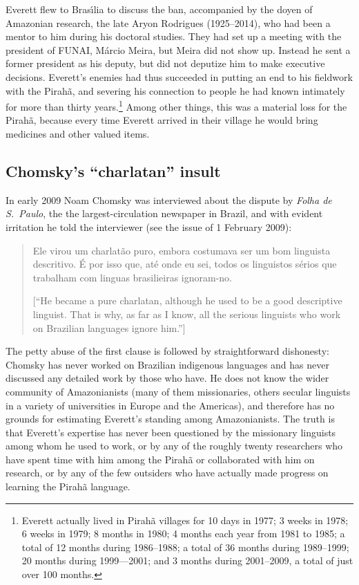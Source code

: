 \documentclass[output=paper,colorlinks,citecolor=brown
]{langscibook}
\begin{document}
Everett flew to Bras{\'\i}lia to discuss the ban, accompanied by the
doyen of Amazonian research, the late Aryon Rodrigues (1925--2014),
who had been a mentor to him during his doctoral studies. They had
set up a meeting with the president of FUNAI, M{\'a}rcio Meira, but
Meira did not show up. Instead he sent a former president as his
deputy, but did not deputize him to make executive decisions.
Everett's enemies had thus succeeded in putting an end to his fieldwork
with the Pirah{\~a}, and severing his connection to people he had known
intimately for more than thirty years.\footnote{%
   Everett actually lived in Pirah{\~a} villages for 10 days in 1977;
   3 weeks in 1978; 6 weeks in 1979; 8 months in 1980; 4 months each year
   from 1981 to 1985; a total of 12 months during 1986--1988; a total of
   36 months during 1989--1999; 20 months during 1999—2001; and 3 months
   during 2001--2009, a total of just over 100 months.}
Among other things, this was a material loss for the Pirah{\~a}, because
every time Everett arrived in their village he would bring medicines and
other valued items.

\subsection{Chomsky's ``charlatan'' insult}

In early 2009 Noam Chomsky was interviewed about the dispute by
\textit{Folha de S.~Paulo}, the the largest-circulation newspaper in
Brazil, and with evident irritation he told the interviewer (see the
issue of 1 February 2009):
\begin{quote}
Ele virou um charlat{\~a}o puro, embora costumava ser um bom linguista
descritivo. {\'E} por isso que, at{\'e} onde eu sei, todos os linguistos
s{\'e}rios que trabalham com linguas brasilieiras ignoram-no.

[``He became a pure charlatan, although he used to be a good descriptive
linguist. That is why, as far as I know, all the serious linguists
who work on Brazilian languages ignore him.'']
\end{quote}

The petty abuse of the first clause is followed by straightforward
dishonesty: Chomsky has never worked on Brazilian indigenous languages
and has never discussed any detailed work by those who have. He does
not know the wider community of Amazonianists (many of them missionaries,
others secular linguists in a variety of universities in Europe and the
Americas), and therefore has no grounds for estimating Everett's standing
among Amazonianists. The truth is that Everett's expertise has never been
questioned by the missionary linguists among whom he used to work, or by
any of the roughly twenty researchers who have spent time with him among
the Pirah{\~a} or collaborated with him on research, or by any of the
few outsiders who have actually made progress on learning the Pirah{\~a}
language.
\end{document}
